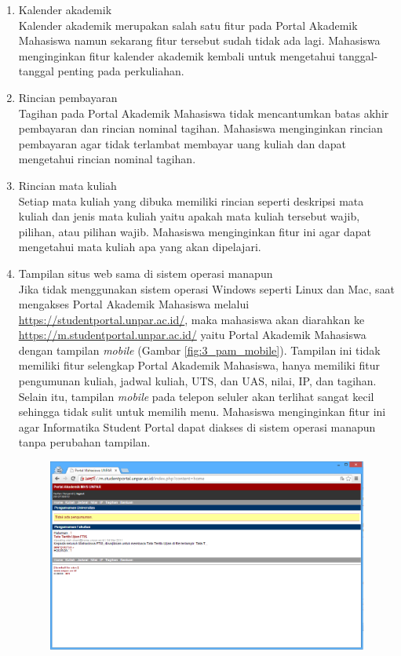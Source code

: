 \begin{enumerate}
	\item Kalender akademik\\
	Kalender akademik merupakan salah satu fitur pada Portal Akademik Mahasiswa namun sekarang fitur tersebut sudah tidak ada lagi. Mahasiswa menginginkan fitur kalender akademik kembali untuk mengetahui tanggal-tanggal penting pada perkuliahan. 
	\item Rincian pembayaran\\
	Tagihan pada Portal Akademik Mahasiswa tidak mencantumkan batas akhir pembayaran dan rincian nominal tagihan. Mahasiswa menginginkan rincian pembayaran agar tidak terlambat membayar uang kuliah dan dapat mengetahui rincian nominal tagihan.
	\item Rincian mata kuliah\\
	Setiap mata kuliah yang dibuka memiliki rincian seperti deskripsi mata kuliah dan jenis mata kuliah yaitu apakah mata kuliah tersebut wajib, pilihan, atau pilihan wajib. Mahasiswa menginginkan fitur ini agar dapat mengetahui mata kuliah apa yang akan dipelajari.
	\item Tampilan situs web sama di sistem operasi manapun\\
	Jika tidak menggunakan sistem operasi Windows seperti Linux dan Mac, saat mengakses Portal Akademik Mahasiswa melalui \url{https://studentportal.unpar.ac.id/}, maka mahasiswa akan diarahkan ke \url{https://m.studentportal.unpar.ac.id/} yaitu Portal Akademik Mahasiswa dengan tampilan \textit{mobile} (Gambar \ref{fig:3_pam_mobile}). Tampilan ini tidak memiliki fitur selengkap Portal Akademik Mahasiswa, hanya memiliki fitur pengumunan kuliah, jadwal kuliah, UTS, dan UAS, nilai, IP, dan tagihan. Selain itu, tampilan \textit{mobile} pada telepon seluler akan terlihat sangat kecil sehingga tidak sulit untuk memilih menu. Mahasiswa menginginkan fitur ini agar Informatika Student Portal dapat diakses di sistem operasi manapun tanpa perubahan tampilan.
	\begin{figure}[H]
			\centering
			\includegraphics[scale=0.5]{Gambar/pam-mobile}

\end{figure}
\end{enumerate}
